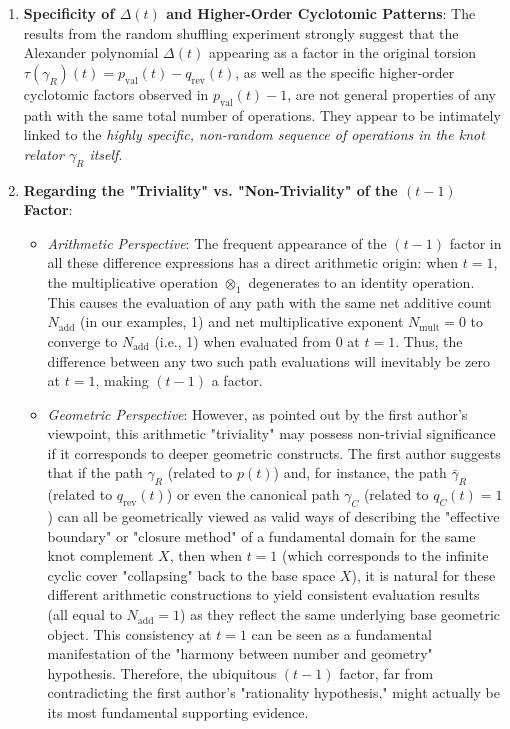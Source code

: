 \documentclass{article}[a4paper,12pt]
\begin{document}
\begin{enumerate}
    \item \textbf{Specificity of $\Delta(t)$ and Higher-Order Cyclotomic Patterns}: The results from the random shuffling experiment strongly suggest that the Alexander polynomial $\Delta(t)$ appearing as a factor in the original torsion $\tau(\gamma_R)(t) = p_{\text{val}}(t) - q_{\text{rev}}(t)$, as well as the specific higher-order cyclotomic factors observed in $p_{\text{val}}(t)-1$, are not general properties of any path with the same total number of operations. They appear to be intimately linked to the \emph{highly specific, non-random sequence of operations in the knot relator $\gamma_R$ itself}.
    \item \textbf{Regarding the "Triviality" vs. "Non-Triviality" of the $(t-1)$ Factor}:
    \begin{itemize}
        \item \textit{Arithmetic Perspective}: The frequent appearance of the $(t-1)$ factor in all these difference expressions has a direct arithmetic origin: when $t=1$, the multiplicative operation $\otimes_1$ degenerates to an identity operation. This causes the evaluation of any path with the same net additive count $N_{\text{add}}$ (in our examples, 1) and net multiplicative exponent $N_{\text{mult}}=0$ to converge to $N_{\text{add}}$ (i.e., 1) when evaluated from 0 at $t=1$. Thus, the difference between any two such path evaluations will inevitably be zero at $t=1$, making $(t-1)$ a factor.
        \item \textit{Geometric Perspective}: However, as pointed out by the first author's viewpoint, this arithmetic "triviality" may possess non-trivial significance if it corresponds to deeper geometric constructs. The first author suggests that if the path $\gamma_R$ (related to $p(t)$) and, for instance, the path $\bar{\gamma}_R$ (related to $q_{\text{rev}}(t)$) or even the canonical path $\gamma_C$ (related to $q_C(t)=1$) can all be geometrically viewed as valid ways of describing the "effective boundary" or "closure method" of a fundamental domain for the same knot complement $X$, then when $t=1$ (which corresponds to the infinite cyclic cover "collapsing" back to the base space $X$), it is natural for these different arithmetic constructions to yield consistent evaluation results (all equal to $N_{\text{add}}=1$) as they reflect the same underlying base geometric object. This consistency at $t=1$ can be seen as a fundamental manifestation of the "harmony between number and geometry" hypothesis. Therefore, the ubiquitous $(t-1)$ factor, far from contradicting the first author's "rationality hypothesis," might actually be its most fundamental supporting evidence.

\end{itemize}
\end{enumerate}
\end{document}
